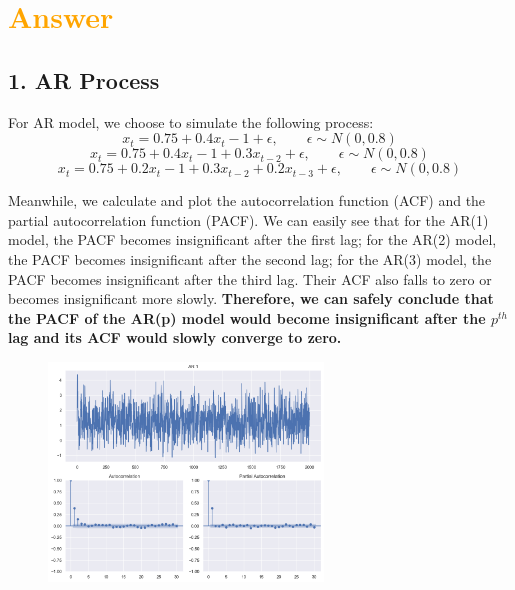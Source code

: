 \documentclass[11pt,en]{elegantpaper}
\begin{document}
\section*{\textcolor{orange}{Answer}}

\subsection*{1. AR Process}
For AR model, we choose to simulate the following process:
\[x_t=0.75+0.4x_t-1+\epsilon, \qquad \epsilon \sim N(0,0.8)\]
\[x_t=0.75+0.4x_t-1+0.3x_{t-2}+\epsilon, \qquad \epsilon \sim N(0,0.8)\]
\[x_t=0.75+0.2x_t-1+0.3x_{t-2}+0.2x_{t-3}+\epsilon, \qquad \epsilon \sim N(0,0.8)\]

Meanwhile, we calculate and plot the autocorrelation function (ACF) and the partial 
autocorrelation function (PACF). We can easily see that for the AR(1) model, the PACF 
becomes insignificant after the first lag; for the AR(2) model, the PACF becomes 
insignificant after the second lag; for the AR(3) model, the PACF becomes insignificant 
after the third lag. Their ACF also falls to zero or becomes insignificant more slowly. 
\textbf{Therefore, we can safely conclude that the PACF of the AR(p) model would become 
insignificant after the $p^{th}$ lag and its ACF would slowly converge to zero.}


\begin{figure}[htbp] 
    \centering 
    \includegraphics[width=0.65\textwidth]{./image/AR1} 
\end{figure}
\end{document}
